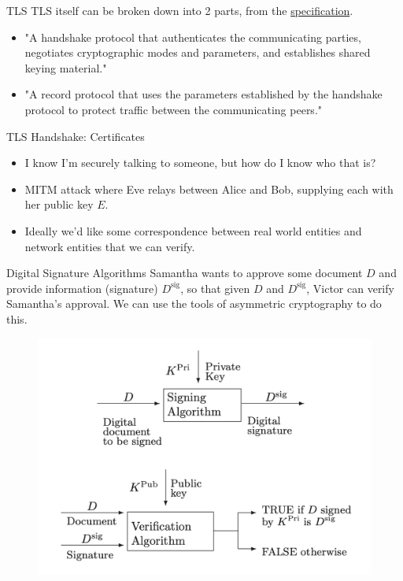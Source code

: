 \documentclass{beamer}
\begin{document}
\begin{frame}{TLS}
    TLS itself can be broken down into 2 parts, from the \href{https://www.rfc-editor.org/rfc/rfc8446.txt}{specification}.
    \begin{itemize}
        \item "A handshake protocol that authenticates the
        communicating parties, negotiates cryptographic modes and
        parameters, and establishes shared keying material."

        \item "A record protocol that uses the parameters established
        by the handshake protocol to protect traffic between the
        communicating peers."
    \end{itemize}
\end{frame}

\begin{frame}{TLS Handshake: Certificates}
    \begin{itemize}
        \item I know I'm securely talking to someone, but how do I know who that is?
        \item MITM attack where Eve relays between Alice and Bob, supplying each with her public key $E$.
        \item Ideally we'd like some correspondence between real world entities and network entities that we can verify.
    \end{itemize}
\end{frame}

\begin{frame}{Digital Signature Algorithms}
    Samantha wants to approve some document $D$ and provide information (signature) $D^{\text{sig}}$, so that given $D$ and $D^{\text{sig}}$, Victor can verify Samantha's approval. We can use the tools of asymmetric cryptography to do this.
    \begin{figure}
        \centering
        \includegraphics[width=0.7\linewidth]{figures/DSA.png} 
    \end{figure}
\end{frame}
\end{document}
